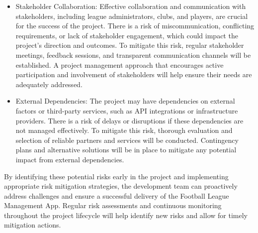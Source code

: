 \documentclass[12pt]{article}
\begin{document}
\begin{itemize}
    \item Stakeholder Collaboration: Effective collaboration and communication with stakeholders, including league administrators, clubs, and players, are crucial for the success of the project. There is a risk of miscommunication, conflicting requirements, or lack of stakeholder engagement, which could impact the project's direction and outcomes. To mitigate this risk, regular stakeholder meetings, feedback sessions, and transparent communication channels will be established. A project management approach that encourages active participation and involvement of stakeholders will help ensure their needs are adequately addressed.

    \item External Dependencies: The project may have dependencies on external factors or third-party services, such as API integrations or infrastructure providers. There is a risk of delays or disruptions if these dependencies are not managed effectively. To mitigate this risk, thorough evaluation and selection of reliable partners and services will be conducted. Contingency plans and alternative solutions will be in place to mitigate any potential impact from external dependencies.
\end{itemize}
By identifying these potential risks early in the project and implementing appropriate risk mitigation strategies, the development team can proactively address challenges and ensure a successful delivery of the Football League Management App. Regular risk assessments and continuous monitoring throughout the project lifecycle will help identify new risks and allow for timely mitigation actions.
\end{document}
